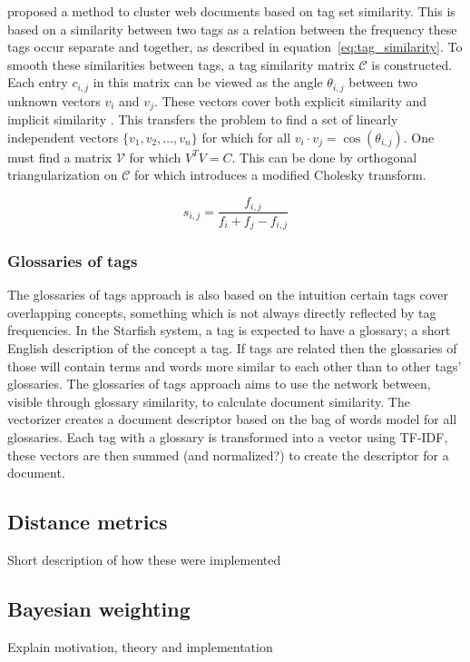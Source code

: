 \citet{zhou2011web} proposed a method to cluster web documents based on tag set similarity. This is based on a similarity between two tags as a relation between the frequency these tags occur separate and together, as described in equation~\ref{eq:tag_similarity}. To smooth these similarities between tags, a tag similarity matrix $\mathcal{C}$ is constructed. Each entry $c_{i,j}$ in this matrix can be viewed as the angle $\theta_{i,j}$ between two unknown vectors $v_i$ and $v_j$. These vectors cover both explicit similarity and implicit similarity \citep{park2010vector}. This transfers the problem to find a set of linearly independent vectors $\{v_1,v_2,\ldots,v_n\}$ for which for all $v_i \cdot v_j = \cos(\theta_{i,j})$. One must find a matrix $\mathcal{V}$ for which $V^TV = C$. This can be done by orthogonal triangularization on $\mathcal{C}$ for which \citeauthor{zhou2011web} introduces a modified Cholesky transform.

\begin{equation} \label{eq:tag_similarity}
s_{i,j} = \frac{f_{i,j}}{f_i + f_j - f_{i,j}}
\end{equation}


\subsubsection{Glossaries of tags}
The glossaries of tags approach is also based on the intuition certain tags cover overlapping concepts, something which is not always directly reflected by tag frequencies. In the Starfish system, a tag is expected to have a glossary; a short English description of the concept a tag. If tags are related then the glossaries of those will contain terms and words more similar to each other than to other tags' glossaries. The glossaries of tags approach aims to use the network between, visible through glossary similarity, to calculate document similarity.
The vectorizer creates a document descriptor based on the bag of words model for all glossaries. Each tag with a glossary is transformed into a vector using TF-IDF, these vectors are then summed (and normalized?) to create the descriptor for a document.

\subsection{Distance metrics}
Short description of how these were implemented

\subsection{Bayesian weighting}
Explain motivation, theory and implementation 

